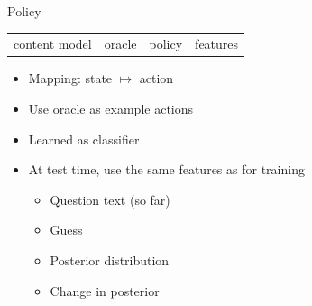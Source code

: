 \documentclass[compress]{beamer}
\begin{document}
\begin{frame}{Policy}

\begin{block}{}
  \begin{center}
    \vspace{-.5cm}
    \begin{tabular}{cccc}
      content model & oracle & \alert{policy} & features \\
    \end{tabular}
    \vspace{-.5cm}
  \end{center}
\end{block}

 \begin{itemize}
    \item Mapping: state $\mapsto$ action
    \item Use oracle as example actions
    \item Learned as classifier \cite{langford-05}
    \item At test time, use the same features as for training
      \begin{itemize}
        \item Question text (so far)
        \item Guess
        \item Posterior distribution
        \item Change in posterior
      \end{itemize}
\end{itemize}

\end{frame}
\end{document}
